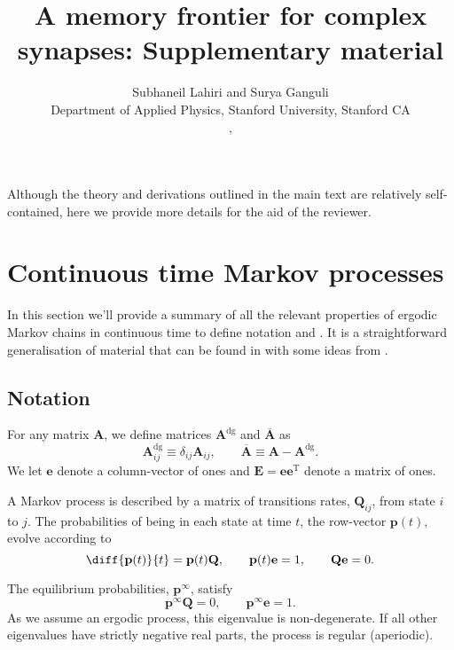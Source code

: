 \documentclass{article} %
\title{A memory frontier for complex synapses: Supplementary material}
\author{Subhaneil Lahiri and Surya Ganguli\\
Department of Applied Physics, Stanford University, Stanford CA\\
\emaillink{sulahiri@stanford.edu}, \emaillink{sulahiri@stanford.edu}
%
}
\newcommand{\dg}{^\mathrm{dg}}
\newcommand{\trans}{^\mathrm{T}}
\newcommand{\onev}{\mathbf{e}}
\newcommand{\onem}{\mathbf{E}}
\newcommand{\MM}{\mathbf{Q}}
\newcommand{\pr}{\mathbf{p}}
\newcommand{\eq}{\pr^\infty}
\begin{document}
\maketitle



Although the theory and derivations outlined in the main text are relatively self-contained, here we provide more details for the aid of the reviewer.

\section{Continuous time Markov processes}\label{sec:ContMarkov}

In this section we'll provide a summary of all the relevant properties of ergodic Markov chains in continuous time to define notation and .
It is a straightforward generalisation of material that can be found in \cite{kemeny1960finite} with some ideas from \cite{hunter2000survey}.


\subsection{Notation}\label{sec:not}

For any matrix $\mathbf{A}$, we define matrices $\mathbf{A}\dg$ and $\overline{\mathbf{A}}$ as
%
\begin{equation}\label{eq:dgdef}
  \mathbf{A}\dg_{ij} \equiv \delta_{ij}\mathbf{A}_{ij},
  \qquad
  \overline{\mathbf{A}} \equiv \mathbf{A}-\mathbf{A}\dg.
\end{equation}
%
We let $\onev$ denote a column-vector of ones and $\onem=\onev\onev\trans$ denote a matrix of ones.


A Markov process is described by a matrix of transitions rates, $\MM_{ij}$, from state $i$ to $j$.
The probabilities of being in each state at time $t$, the row-vector $\mathbf{p}(t)$, evolve according to
%
\begin{equation}\label{eq:rowsum}
  \diff{\mathbf{p}(t)}{t} = \mathbf{p}(t) \MM,
  \qquad
  \mathbf{p}(t)\onev=1,
  \qquad
  \MM\onev=0.
\end{equation}
%

The equilibrium probabilities, $\eq$, satisfy
%
\begin{equation}\label{eq:equilibrium}
  \eq\MM=0,
  \qquad
  \eq\onev=1.
\end{equation}
%
As we assume an ergodic process, this eigenvalue is non-degenerate.
If all other eigenvalues have strictly negative real parts, the process is regular (aperiodic).
\end{document}
